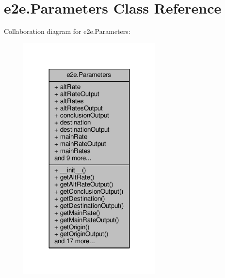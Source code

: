 \hypertarget{classe2e_1_1_parameters}{}\section{e2e.\+Parameters Class Reference}
\label{classe2e_1_1_parameters}


Collaboration diagram for e2e.\+Parameters\+:\nopagebreak
\begin{figure}[H]
\begin{center}
\leavevmode
\includegraphics[width=204pt]{classe2e_1_1_parameters__coll__graph}
\end{center}
\end{figure}
